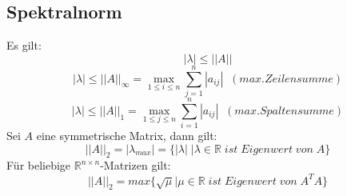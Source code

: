 \documentclass[a4paper,twocolumn,10pt]{article}
\begin{document}
\subsection{Spektralnorm}
Es gilt:
\begin{equation*}
|\lambda|\leq ||A||
\end{equation*}
\begin{equation*}
|\lambda|\leq ||A||_{\infty}=\max\limits_{1\leq i\leq n}\sum\limits_{j=1}^{n}|a_{ij}|\;\;(max. Zeilensumme)
\end{equation*}
\begin{equation*}
|\lambda|\leq ||A||_1=\max\limits_{1\leq j\leq n}\sum\limits_{i=1}^{n}|a_{ij}|\;\;(max. Spaltensumme)
\end{equation*}
Sei $A$ eine symmetrische Matrix, dann gilt:
\begin{equation*}
||A||_2 =|\lambda_{max}|=\{|\lambda|\;|\lambda\in\mathbb{R}\;ist\;Eigenwert\;von\;A\}
\end{equation*}
Für beliebige $\mathbb{R}^{n\times n}$-Matrizen gilt:
\begin{equation*}
||A||_2=max\{\sqrt{\mu}|\mu\in\mathbb{R}\;ist\;Eigenwert\;von\;A^TA\}
\end{equation*}
\end{document}
